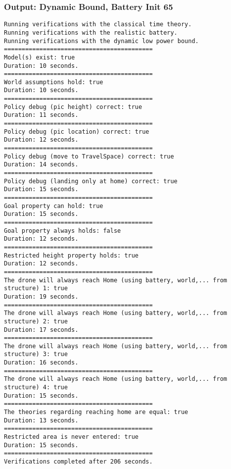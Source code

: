 \documentclass[12pt]{extarticle}
\begin{document}
\subsubsection*{Output: Dynamic Bound, Battery Init 65}
\begin{lstlisting}[basicstyle=\tiny]
Running verifications with the classical time theory.
Running verifications with the realistic battery.
Running verifications with the dynamic low power bound.
==========================================
Model(s) exist: true
Duration: 10 seconds.
==========================================
World assumptions hold: true
Duration: 10 seconds.
==========================================
Policy debug (pic height) correct: true
Duration: 11 seconds.
==========================================
Policy debug (pic location) correct: true
Duration: 12 seconds.
==========================================
Policy debug (move to TravelSpace) correct: true
Duration: 14 seconds.
==========================================
Policy debug (landing only at home) correct: true
Duration: 15 seconds.
==========================================
Goal property can hold: true
Duration: 15 seconds.
==========================================
Goal property always holds: false
Duration: 12 seconds.
==========================================
Restricted height property holds: true
Duration: 12 seconds.
==========================================
The drone will always reach Home (using battery, world,... from structure) 1: true
Duration: 19 seconds.
==========================================
The drone will always reach Home (using battery, world,... from structure) 2: true
Duration: 17 seconds.
==========================================
The drone will always reach Home (using battery, world,... from structure) 3: true
Duration: 16 seconds.
==========================================
The drone will always reach Home (using battery, world,... from structure) 4: true
Duration: 15 seconds.
==========================================
The theories regarding reaching home are equal: true
Duration: 13 seconds.
==========================================
Restricted area is never entered: true
Duration: 15 seconds.
==========================================
Verifications completed after 206 seconds.
\end{lstlisting}
\end{document}
